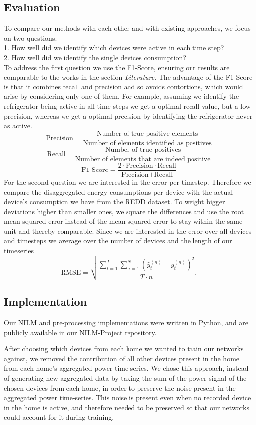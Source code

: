 \documentclass{article}
\begin{document}
\subsection{Evaluation}
To compare our methods with each other and with existing approaches, we focus on two questions.\\
1. How well did we identify which devices were active in each time step?\\
2. How well did we identify the single devices consumption?\\
To address the first question we use the F1-Score, ensuring our results are comparable to the works in the section \textit{Literature}. The 
advantage of the F1-Score is that it combines recall and precision and so avoids contortions, which would arise by considering only one of them. For example, assuming we 
identify the refrigerator being active in all time steps we get a optimal recall value, but a low precision, whereas we get a optimal precision by identifying the refrigerator never as active.
\[ \textrm{Precision} = \frac{\textrm{Number of true positive elements}}{\textrm{Number of elements identified as positives}}  \]
\[ \textrm{Recall} = \frac{\textrm{Number of true positives}}{\textrm{Number of elements that are indeed positive}}  \]
\[ \textrm{F1-Score} = \frac{2 \cdot \textrm{Precision} \cdot \textrm{Recall}}{\textrm{Precision} + \textrm{Recall}}\]
For the second question we are interested in the error per timestep. Therefore we
compare the disaggregated energy consumptions per device with the actual device's consumption we have from the REDD
dataset. 
To weight bigger deviations higher than smaller ones, we square the differences and use the root mean squared error instead of the mean squared error to stay within the same unit and thereby comparable. Since we are interested in the error over all devices and timesteps we average over the number of devices and the length of our timeseries
\[\textrm{RMSE} = \sqrt{\frac{\sum^{T}_{t=1}\sum^{N}_{n=1}(\hat{y}^{(n)}_t-y^{(n)}_t)^2}{T \cdot n}} .  \]



\subsection{Implementation}
Our NILM and pre-processing implementations were written in Python, and are publicly available in our \href{https://github.com/CMPUT-466-551-ML-Project/NILM-Project}{NILM-Project} repository.

After choosing which devices from each home we wanted to train our networks against, we removed the contribution of all other devices present in the home from each home's aggregated power time-series.
We chose this approach, instead of generating new aggregated data by taking the sum of the power signal of the chosen devices from each home, in order to preserve the noise present in the aggregated power time-series.
This noise is present even when no recorded device in the home is active, and therefore needed to be preserved so that our networks could account for it during training.
\end{document}

